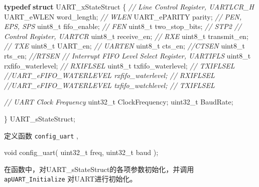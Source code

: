 \documentclass[
  12pt,
]{book}
\newenvironment{Shaded}{\begin{snugshade}}{\end{snugshade}}
\newcommand{\CommentTok}[1]{\textcolor[rgb]{0.56,0.35,0.01}{\textit{#1}}}
\newcommand{\DataTypeTok}[1]{\textcolor[rgb]{0.13,0.29,0.53}{#1}}
\newcommand{\KeywordTok}[1]{\textcolor[rgb]{0.13,0.29,0.53}{\textbf{#1}}}
\newcommand{\NormalTok}[1]{#1}
\begin{document}
\begin{Shaded}
\begin{Highlighting}[]
\KeywordTok{typedef} \KeywordTok{struct}\NormalTok{ UART_xStateStruct}
\NormalTok{\{}
    \CommentTok{// Line Control Register, UARTLCR_H}
\NormalTok{  UART_eWLEN      word_length;   }\CommentTok{// WLEN}
\NormalTok{  UART_ePARITY    parity;        }\CommentTok{// PEN, EPS, SPS}
  \DataTypeTok{uint8_t}\NormalTok{         fifo_enable;   }\CommentTok{// FEN}
  \DataTypeTok{uint8_t}\NormalTok{         two_stop_bits; }\CommentTok{// STP2}
  \CommentTok{// Control Register, UARTCR}
  \DataTypeTok{uint8_t}\NormalTok{         receive_en;        }\CommentTok{// RXE}
  \DataTypeTok{uint8_t}\NormalTok{         transmit_en;       }\CommentTok{// TXE}
  \DataTypeTok{uint8_t}\NormalTok{         UART_en;           }\CommentTok{// UARTEN}
  \DataTypeTok{uint8_t}\NormalTok{         cts_en;            }\CommentTok{//CTSEN}
  \DataTypeTok{uint8_t}\NormalTok{         rts_en;            }\CommentTok{//RTSEN}
  \CommentTok{// Interrupt FIFO Level Select Register, UARTIFLS}
  \DataTypeTok{uint8_t}\NormalTok{         rxfifo_waterlevel; }\CommentTok{// RXIFLSEL}
  \DataTypeTok{uint8_t}\NormalTok{         txfifo_waterlevel; }\CommentTok{// TXIFLSEL}
  \CommentTok{//UART_eFIFO_WATERLEVEL    rxfifo_waterlevel; // RXIFLSEL}
  \CommentTok{//UART_eFIFO_WATERLEVEL    txfifo_watchlevel; // TXIFLSEL}

  \CommentTok{// UART Clock Frequency}
  \DataTypeTok{uint32_t}\NormalTok{        ClockFrequency;}
  \DataTypeTok{uint32_t}\NormalTok{        BaudRate;}

\NormalTok{\} UART_sStateStruct;}
\end{Highlighting}
\end{Shaded}

定义函数 \texttt{config\_uart} ,

\begin{Shaded}
\begin{Highlighting}[]
\DataTypeTok{void}\NormalTok{ config_uart(}
  \DataTypeTok{uint32_t}\NormalTok{ freq, }
  \DataTypeTok{uint32_t}\NormalTok{ baud}
\NormalTok{  );}
\end{Highlighting}
\end{Shaded}

在函数中，对UART\_sStateStruct的各项参数初始化，并调用 \texttt{apUART\_Initialize} 对UART进行初始化。
\end{document}
